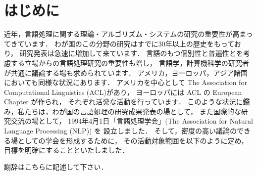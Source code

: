 \documentclass[japanese,tombow]{jnlp_3.3}
\begin{document}
\maketitle


\section{はじめに}

近年，言語処理に関する理論・アルゴリズム・システムの研究の重要性が高まっ
てきています\cite{Article_01}．
わが国のこの分野の研究はすでに30年以上の歴史をもっており，
研究発表は急速に増加して来ています．
言語のもつ個別性と普遍性とを考慮する立場からの言語処理研究の重要性も増し，
言語学，計算機科学の研究者が共通に議論する場も求められています\cite{Book_02}．
アメリカ，ヨーロッパ，アジア諸国においても同様な状況にあります．
アメリカを中心として The Association for Computational Linguistics (ACL)があり，
ヨーロッパには ACL の European Chapter が作られ，
それぞれ活発な活動を行っています\cite{Inproc_03}．
このような状況に鑑み，私たちは，わが国の言語処理の研究成果発表の場として，
また国際的な研究交流の場として，
1994年4月1日「言語処理学会」(The Association for Natural Language Processing (NLP)) を
設立しました\cite{Masters_04,Techrep_05}．
そして，密度の高い議論のできる場としての学会を形成するために，
その活動対象範囲を以下のように定め，
目標を明確にすることといたしました\nocite{Web_06}．



\acknowledgment

謝辞はこちらに記述して下さい．






\begin{biography}

\end{biography}


\end{document}
